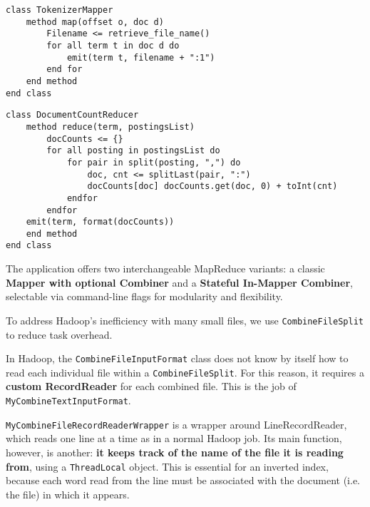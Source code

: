 \begin{center}
	\begin{minipage}{0.9\linewidth}
		\begin{lstlisting}[language=PseudoCode]
class TokenizerMapper
	method map(offset o, doc d)
		Filename <= retrieve_file_name()
		for all term t in doc d do
			emit(term t, filename + ":1")
		end for
	end method
end class
		\end{lstlisting}
		\label{fig:pseudocode-stateless-mapper}
	\end{minipage}
\end{center}
	\begin{center}
		\begin{minipage}{0.9\linewidth}
			\begin{lstlisting}[language=PseudoCode]
class DocumentCountReducer
	method reduce(term, postingsList)
		docCounts <= {}
		for all posting in postingsList do
			for pair in split(posting, ",") do
				doc, cnt <= splitLast(pair, ":")
				docCounts[doc] docCounts.get(doc, 0) + toInt(cnt)
			endfor
		endfor
	emit(term, format(docCounts))
	end method
end class
			\end{lstlisting}
			\label{fig:pseudocode-reducer}
		\end{minipage}
\end{center}

The application offers two interchangeable MapReduce variants: a classic \textbf{Mapper with optional Combiner} and a \textbf{Stateful In-Mapper Combiner}, selectable via command-line flags for modularity and flexibility.

To address Hadoop's inefficiency with many small files, we use \texttt{CombineFileSplit} to reduce task overhead. 

In Hadoop, the \texttt{CombineFileInputFormat} class does not know by itself how to read each individual file within a \texttt{CombineFileSplit}. For this reason, it requires a \textbf{custom RecordReader} for each combined file. This is the job of \texttt{MyCombineTextInputFormat}.

\texttt{MyCombineFileRecordReaderWrapper} is a wrapper around LineRecordReader, which reads one line at a time as in a normal Hadoop job. Its main function, however, is another: \textbf{it keeps track of the name of the file it is reading from}, using a \texttt{ThreadLocal} object. This is essential for an inverted index, because each word read from the line must be associated with the document (i.e. the file) in which it appears. 

